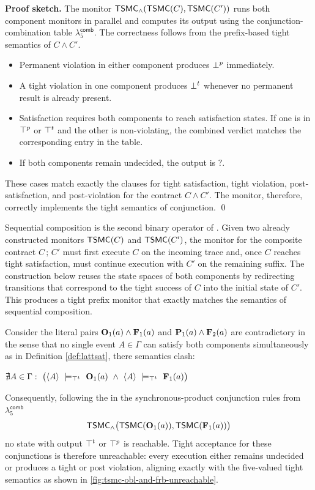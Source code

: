 \noindent
\textbf{Proof sketch.}
The monitor $\tsmc_{\wedge}(\tsmc(C),\tsmc(C'))$ runs both component monitors in parallel and
computes its output using the conjunction-combination table
$\lambda_{5}^{\textsf{comb}}$. The correctness follows from the prefix-based
tight semantics of $C \wedge C'$.

\begin{itemize}
  \item Permanent violation in either component produces $\botp$ immediately.
  \item A tight violation in one component produces $\bott$ whenever no permanent result is already present.
  \item Satisfaction requires both components to reach satisfaction states.  
        If one is in $\topp$ or $\topt$ and the other is non-violating, the
        combined verdict matches the corresponding entry in the table.
  \item If both components remain undecided, the output is $\mathsf{?}$.
\end{itemize}

These cases match exactly the clauses for tight satisfaction, tight violation,
post-satisfaction, and post-violation for the contract $C \wedge C'$. The monitor, therefore, correctly implements the tight semantics of conjunction.
\qed


Sequential composition is the second binary operator of \cDL. Given two already
constructed monitors $\tsmc(C)$ and $\tsmc(C')$, the monitor for the composite
contract $C\,;\,C'$ must first execute $C$ on the incoming trace and, once $C$
reaches tight satisfaction, must continue execution with $C'$ on the remaining
suffix. The construction below reuses the state spaces of both components by redirecting transitions that correspond to the tight success of $C$
into the initial state of $C'$. This produces a tight prefix monitor that exactly matches the semantics of sequential composition.

\begin{remark}
  \label{rem:contradicting-literals}
    Consider the literal pairs $\obl[1]{a}\wedge\frb[1]{a}$ and $\perm[1]{a}\wedge\frb[2]{a}$ are contradictory in the sense that no single event $A\in\Gamma$ can satisfy both components simultaneously as in Definition \ref{def:lattsat}, there semantics clash:
    
   $ \nexists A\in\Gamma:\ \bigl(\trace{A}\ \satt\ \obl[1]{a}\ \land\ \trace{A}\ \satt\ \frb[1]{a}\bigr)$
  
    Consequently, following the in the synchronous-product conjunction rules from $\lambda_{5}^{\textsf{comb}}$ \\
    $$
    \tsmc_{\wedge}\bigl(\tsmc(\obl[1]{a}),\tsmc(\frb[1]{a})\bigr)
  $$
    no state with output $\topt$ or $\topp$ is reachable.
    Tight acceptance for these conjunctions is therefore unreachable: every execution either remains undecided or produces a tight or post violation, aligning exactly with the five-valued tight semantics as shown in \ref{fig:tsmc-obl-and-frb-unreachable}.
  \end{remark}

